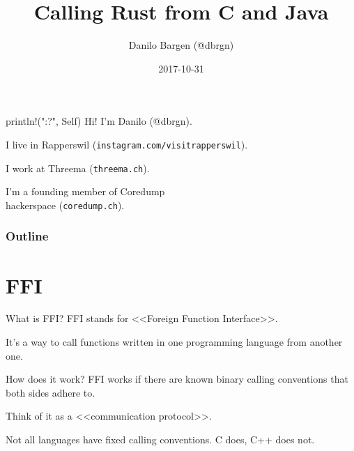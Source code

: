 \documentclass[aspectratio=1610,14pt,t]{beamer}
\title{Calling Rust from C and Java}
\date{2017-10-31}
\author{Danilo Bargen (@dbrgn)}
\institute{Rust Zürichsee Meetup}
\begin{document}
\pagecolor{almostwhite}  %
\maketitle


\begin{frame}[c]{println!("{:?}", Self)}
  Hi! I'm Danilo (@dbrgn).

  \pause

  I live in Rapperswil ({\small \texttt{instagram.com/visitrapperswil}}).

  \pause

  I work at Threema ({\small \texttt{threema.ch}}).

  \pause

  I'm a founding member of Coredump\\hackerspace ({\small \texttt{coredump.ch}}).
\end{frame}


\begin{frame}
	\frametitle{Outline}
	\setcounter{tocdepth}{1}
	\tableofcontents
\end{frame}



\section{FFI}

\begin{frame}[c]{What is FFI?}
	FFI stands for <<Foreign Function Interface>>.

  It's a way to call functions written in one programming language
  from another one.
\end{frame}

\begin{frame}[c]{How does it work?}
  FFI works if there are known binary calling conventions that both sides adhere to.

  Think of it as a <<communication protocol>>.

  Not all languages have fixed calling conventions. C does, C++ does not.
\end{frame}
\end{document}

